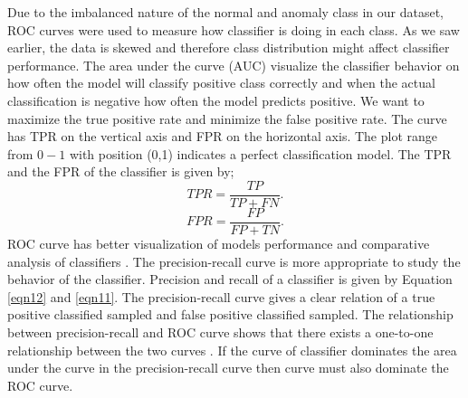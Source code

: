 \documentclass[a4paper,fleqn]{cas-dc}
\begin{document}
Due to the imbalanced nature of the normal and anomaly class in our dataset, ROC curves were used to measure how classifier is doing in each class. As we saw earlier, the data is skewed and therefore class distribution might affect classifier performance. The area under the curve (AUC) visualize the classifier behavior on how often the model will classify positive class correctly and when the actual classification is negative how often the model predicts positive. We want to maximize the true positive rate and minimize the false positive rate. The curve has TPR on the vertical axis and FPR on the horizontal axis. The plot range from  $0 -1$ with position (0,1) indicates a perfect classification model.  
The TPR and the FPR of the classifier is given by;
\begin{equation}
TPR = \frac{TP }{TP +FN}.
\end{equation}
\begin{equation}\label{q19}
FPR = \frac{FP}{FP +TN}.
\end{equation}
ROC curve has better visualization of models performance and comparative analysis of classifiers \cite{japkowicz2011evaluating}.  The precision-recall curve is more appropriate to study the behavior of the classifier. Precision and recall of a classifier is given by  Equation  \eqref{eqn12} and \eqref{eqn11}. The precision-recall curve gives a clear relation of a true positive classified sampled and false positive classified sampled. The relationship between precision-recall and ROC curve shows that there exists a one-to-one relationship between the two curves \cite{davis2006relationship}. If the curve of classifier dominates the area under the curve in the precision-recall curve then curve must also dominate the ROC curve.
\end{document}

